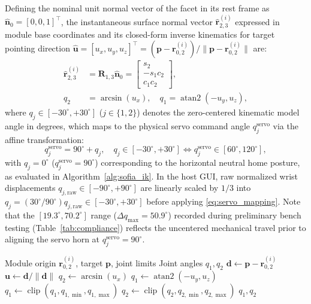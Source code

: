 \documentclass[lettersize,journal]{IEEEtran}
\begin{document}
	Defining the nominal unit normal vector of the facet in its rest frame as $\hat{\mathbf{n}}_0 = [0, 0, 1]^\top$, the instantaneous surface normal vector $\hat{\mathbf{r}}_{2,3}^{(i)}$ expressed in module base coordinates and its closed-form inverse kinematics for target pointing direction $\hat{\mathbf{u}} = [u_x, u_y, u_z]^\top = (\mathbf{p} - \mathbf{r}_{0,2}^{(i)}) / \lVert \mathbf{p} - \mathbf{r}_{0,2}^{(i)} \rVert$ are:
	\begin{align}
		\hat{\mathbf{r}}_{2,3}^{(i)} &= \mathbf{R}_{1,3} \hat{\mathbf{n}}_0 = \begin{bmatrix} s_2 \\ -s_1 c_2 \\ c_1 c_2 \end{bmatrix}, \label{eq:facet_normal} \\
		q_2 &= \arcsin(u_x), \quad q_1 = \operatorname{atan2}(-u_y, u_z), \label{eq:ik_closed_form}
	\end{align}
	where $q_j \in [-30^\circ, +30^\circ]$ ($j \in \{1, 2\}$) denotes the zero-centered kinematic model angle in degrees, which maps to the physical servo command angle $q_j^{\text{servo}}$ via the affine transformation:
	\begin{equation}
		q_j^{\text{servo}} = 90^\circ + q_j, \quad q_j \in [-30^\circ, +30^\circ] \iff q_j^{\text{servo}} \in [60^\circ, 120^\circ],
		\label{eq:servo_mapping}
	\end{equation}
	with $q_j = 0^\circ$ ($q_j^{\text{servo}} = 90^\circ$) corresponding to the horizontal neutral home posture, as evaluated in Algorithm~\ref{alg:sofia_ik}. In the host GUI, raw normalized wrist displacements $q_{j,\text{raw}} \in [-90^\circ, +90^\circ]$ are linearly scaled by $1/3$ into $q_j = (30^\circ / 90^\circ)q_{j,\text{raw}} \in [-30^\circ, +30^\circ]$ before applying \eqref{eq:servo_mapping}. Note that the $[19.3^\circ, 70.2^\circ]$ range ($\Delta q_{\max} = 50.9^\circ$) recorded during preliminary bench testing (Table~\ref{tab:compliance}) reflects the uncentered mechanical travel prior to aligning the servo horn at $q_j^{\text{servo}} = 90^\circ$.
	
	
	\begin{algorithm}[!t]
		\caption{SOFIA Module Inverse Kinematics}
		\label{alg:sofia_ik}
		\footnotesize
		\begin{algorithmic}[1]
			\Require Module origin $\mathbf{r}_{0,2}^{(i)}$, target $\mathbf{p}$, joint limits
			\Ensure Joint angles $q_1,q_2$
			\State $\mathbf{d} \gets \mathbf{p}-\mathbf{r}_{0,2}^{(i)}$
			\State $\mathbf{u} \gets \mathbf{d}/\|\mathbf{d}\|$
			\State $q_2 \gets \arcsin(u_x)$
			\State $q_1 \gets \operatorname{atan2}(-u_y,u_z)$
			\State $q_1 \gets \operatorname{clip}(q_1,q_{1,\min},q_{1,\max})$
			\State $q_2 \gets \operatorname{clip}(q_2,q_{2,\min},q_{2,\max})$
			\State \Return $q_1,q_2$
		\end{algorithmic}
	\end{algorithm}
	
\end{document}
